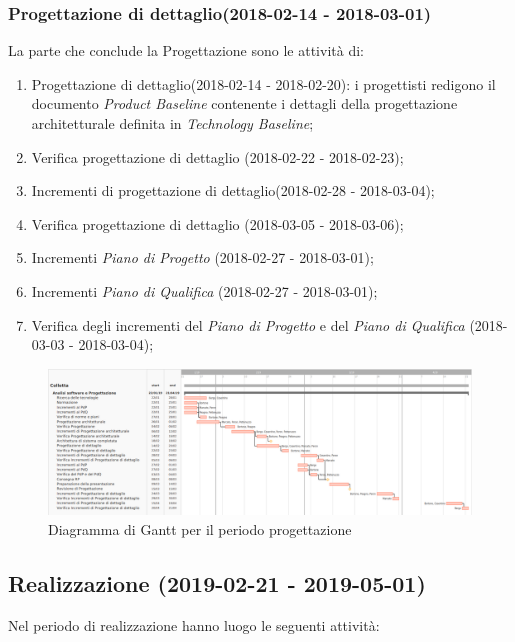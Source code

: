 		\subsubsection{Progettazione di dettaglio(2018-02-14 - 2018-03-01)\\} La parte che conclude la Progettazione sono le attività di:
			\begin{enumerate}[label = 3.3.\arabic*)]
				\item Progettazione di dettaglio(2018-02-14 - 2018-02-20): i progettisti redigono il documento \textit{Product Baseline} contenente i dettagli della progettazione architetturale definita in \textit{Technology Baseline};
				\item Verifica progettazione di dettaglio (2018-02-22 - 2018-02-23);
				\item Incrementi di progettazione di dettaglio(2018-02-28 - 2018-03-04);
				\item Verifica progettazione di dettaglio (2018-03-05 - 2018-03-06);
				\item Incrementi \textit{Piano di Progetto} (2018-02-27 - 2018-03-01);
				\item Incrementi \textit{Piano di Qualifica} (2018-02-27 - 2018-03-01);	
				\item Verifica degli incrementi del \textit{Piano di Progetto} e del \textit{Piano di Qualifica} (2018-03-03 - 2018-03-04);
			\end{enumerate}
	
	\begin{figure}[!hbtp]
		\centering
		\includegraphics[scale=0.5,angle=90]{images/ganttprog.png}
		\caption{Diagramma di Gantt per il periodo progettazione}
	\end{figure}
	
	\newpage	
	\subsection{Realizzazione (2019-02-21 - 2019-05-01)}
		Nel periodo di realizzazione hanno luogo le seguenti attività:
